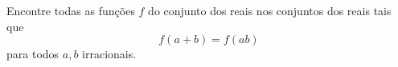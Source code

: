 Encontre todas as funções $f$ do conjunto dos reais nos conjuntos dos reais tais que
$$f(a + b) = f(ab)$$
para todos $a, b$ irracionais.